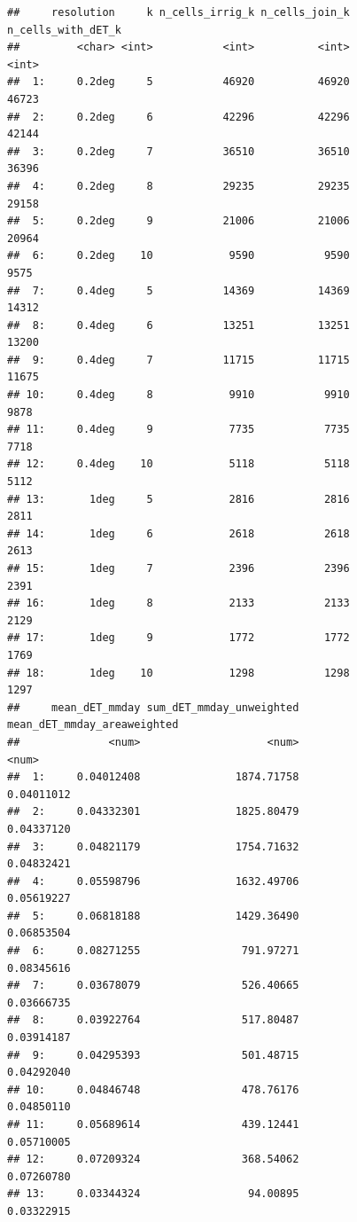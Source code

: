 \documentclass[
  11pt,
]{article}
\begin{document}
\begin{verbatim}
##     resolution     k n_cells_irrig_k n_cells_join_k n_cells_with_dET_k
##         <char> <int>           <int>          <int>              <int>
##  1:     0.2deg     5           46920          46920              46723
##  2:     0.2deg     6           42296          42296              42144
##  3:     0.2deg     7           36510          36510              36396
##  4:     0.2deg     8           29235          29235              29158
##  5:     0.2deg     9           21006          21006              20964
##  6:     0.2deg    10            9590           9590               9575
##  7:     0.4deg     5           14369          14369              14312
##  8:     0.4deg     6           13251          13251              13200
##  9:     0.4deg     7           11715          11715              11675
## 10:     0.4deg     8            9910           9910               9878
## 11:     0.4deg     9            7735           7735               7718
## 12:     0.4deg    10            5118           5118               5112
## 13:       1deg     5            2816           2816               2811
## 14:       1deg     6            2618           2618               2613
## 15:       1deg     7            2396           2396               2391
## 16:       1deg     8            2133           2133               2129
## 17:       1deg     9            1772           1772               1769
## 18:       1deg    10            1298           1298               1297
##     mean_dET_mmday sum_dET_mmday_unweighted mean_dET_mmday_areaweighted
##              <num>                    <num>                       <num>
##  1:     0.04012408               1874.71758                  0.04011012
##  2:     0.04332301               1825.80479                  0.04337120
##  3:     0.04821179               1754.71632                  0.04832421
##  4:     0.05598796               1632.49706                  0.05619227
##  5:     0.06818188               1429.36490                  0.06853504
##  6:     0.08271255                791.97271                  0.08345616
##  7:     0.03678079                526.40665                  0.03666735
##  8:     0.03922764                517.80487                  0.03914187
##  9:     0.04295393                501.48715                  0.04292040
## 10:     0.04846748                478.76176                  0.04850110
## 11:     0.05689614                439.12441                  0.05710005
## 12:     0.07209324                368.54062                  0.07260780
## 13:     0.03344324                 94.00895                  0.03322915

\end{verbatim}
\end{document}
